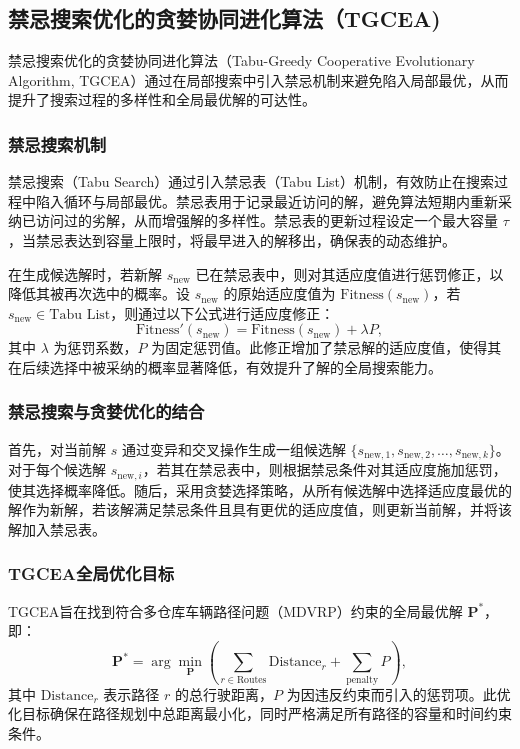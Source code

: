\documentclass[12pt,a4paper,oneside]{ctexart}
\begin{document}
\subsection{禁忌搜索优化的贪婪协同进化算法（TGCEA)}

禁忌搜索优化的贪婪协同进化算法（Tabu-Greedy Cooperative Evolutionary Algorithm, TGCEA）通过在局部搜索中引入禁忌机制来避免陷入局部最优，从而提升了搜索过程的多样性和全局最优解的可达性。

\subsubsection{禁忌搜索机制}

禁忌搜索（Tabu Search）通过引入禁忌表（Tabu List）机制，有效防止在搜索过程中陷入循环与局部最优。禁忌表用于记录最近访问的解，避免算法短期内重新采纳已访问过的劣解，从而增强解的多样性。禁忌表的更新过程设定一个最大容量 $\tau$，当禁忌表达到容量上限时，将最早进入的解移出，确保表的动态维护。

在生成候选解时，若新解 $s_{\text{new}}$ 已在禁忌表中，则对其适应度值进行惩罚修正，以降低其被再次选中的概率。设 $s_{\text{new}}$ 的原始适应度值为 $\text{Fitness}(s_{\text{new}})$，若 $s_{\text{new}} \in \text{Tabu List}$，则通过以下公式进行适应度修正：
\[
\text{Fitness}'(s_{\text{new}}) = \text{Fitness}(s_{\text{new}}) + \lambda P,
\]
其中 $\lambda$ 为惩罚系数，$P$ 为固定惩罚值。此修正增加了禁忌解的适应度值，使得其在后续选择中被采纳的概率显著降低，有效提升了解的全局搜索能力。



\subsubsection{禁忌搜索与贪婪优化的结合}

首先，对当前解 $s$ 通过变异和交叉操作生成一组候选解 $\{s_{\text{new},1}, s_{\text{new},2}, \ldots, s_{\text{new},k}\}$。对于每个候选解 $s_{\text{new},i}$，若其在禁忌表中，则根据禁忌条件对其适应度施加惩罚，使其选择概率降低。随后，采用贪婪选择策略，从所有候选解中选择适应度最优的解作为新解，若该解满足禁忌条件且具有更优的适应度值，则更新当前解，并将该解加入禁忌表。

\subsubsection{TGCEA全局优化目标}

TGCEA旨在找到符合多仓库车辆路径问题（MDVRP）约束的全局最优解 $\bm{P}^*$，即：
\[
\bm{P}^* = \arg \min_{\bm{P}} \left( \sum_{r \in \text{Routes}} \text{Distance}_r + \sum_{\text{penalty}} P \right),
\]
其中 $\text{Distance}_r$ 表示路径 $r$ 的总行驶距离，$P$ 为因违反约束而引入的惩罚项。此优化目标确保在路径规划中总距离最小化，同时严格满足所有路径的容量和时间约束条件。
\end{document}
